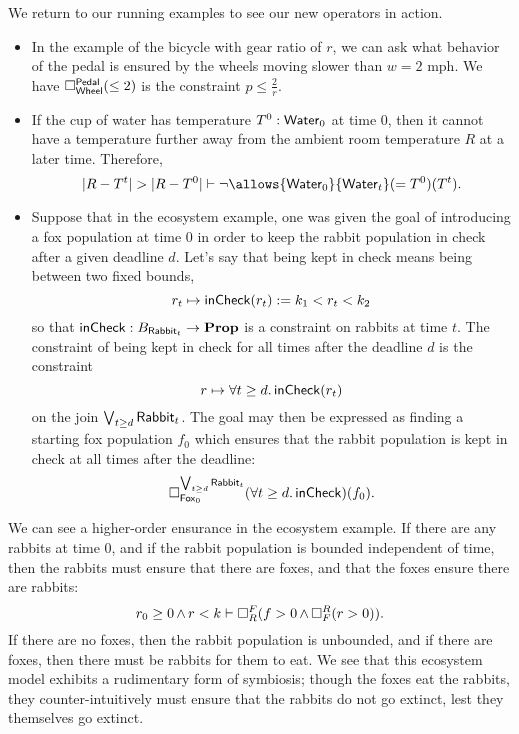    \begin{ex}
    We return to our running examples to see our new operators in action.
    \begin{itemize}
        \item In the example of the bicycle with gear ratio of $r$, we can ask what behavior of the pedal is ensured by the wheels moving slower than $w=2$ mph. We have $\ensure{\type{Pedal}}{\type{Wheel}}(\leq 2)$ is the constraint $p\leq \frac{2}{r}$.
        
        \item If the cup of water has temperature $T^0: \type{Water}_0$ at time $0$, then it cannot have a temperature further away from the ambient room temperature $R$ at a later time. Therefore, 
        $$|R - T^t| > |R - T^0| \vdash \neg \allows{\type{Water}_0}{\type{Water}_t}(=T^0)(T^t).$$
        
        \item Suppose that in the ecosystem example, one was given the goal of introducing a fox population at time $0$ in order to keep the rabbit population in check after a given deadline $d$. Let's say that being kept in check means being between two fixed bounds, $$r_t \mapsto \term{inCheck}(r_t) := k_1 < r_t < k_2$$
        so that $\term{inCheck} : B_{\type{Rabbit}_t} \to \Prop$ is a constraint on rabbits at time $t$. The constraint of being kept in check for all times after the deadline $d$ is the constraint
        $$r \mapsto \forall t \geq d.\, \term{inCheck}(r_t)$$
        on the join $\bigvee_{t \geq d} \type{Rabbit}_t$. The goal may then be expressed as finding a starting fox population $f_0$ which ensures that the rabbit population is kept in check at all times after the deadline:
        $$\ensure{\bigvee_{t \geq d} \type{Rabbit}_t}{\type{Fox}_0}(\forall t \geq d.\, \term{inCheck})(f_0).$$   
        \end{itemize}
 \end{ex}
 
\begin{ex}
We can see a higher-order ensurance in the ecosystem example. If there are any rabbits at time $0$, and if the rabbit population is bounded independent of time, then the rabbits must ensure that there are foxes, and that the foxes ensure there are rabbits:
    $$r_0 \geq 0 \meet r < k \vdash \ensure{F}{R} (f > 0 \meet \ensure{R}{F}(r > 0)).$$ 
If there are no foxes, then the rabbit population is unbounded, and if there are foxes, then there must be rabbits for them to eat. We see that this ecosystem model exhibits a rudimentary form of symbiosis; though the foxes eat the rabbits, they counter-intuitively must ensure that the rabbits do not go extinct, lest they themselves go extinct.
\end{ex}
 
